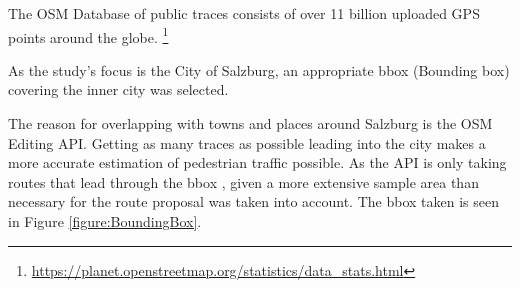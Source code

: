 %
%
%

The OSM Database of public traces consists of over 11 billion uploaded GPS points around the globe. \footnote{\url{https://planet.openstreetmap.org/statistics/data_stats.html}}

As the study's focus is the City of Salzburg, an appropriate bbox (Bounding box) covering the inner city was selected. 

The reason for overlapping with towns and places around Salzburg is the OSM Editing API. Getting as many traces as possible leading into the city makes a more accurate estimation of pedestrian traffic possible. As the API is only taking routes that lead through the bbox , given a more extensive sample area than necessary for the route proposal was taken into account. The bbox taken is seen in Figure \ref{figure:BoundingBox}.

